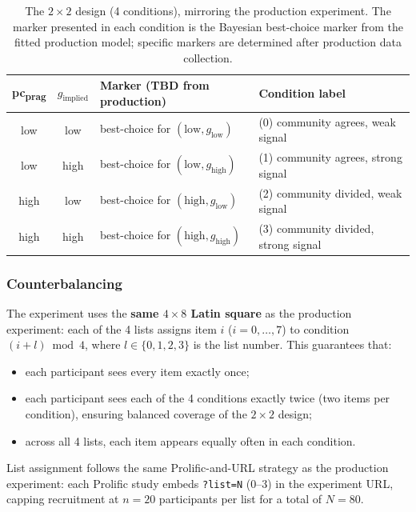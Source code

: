 \documentclass[12pt]{article}
\begin{document}
\begin{table}[ht]
\centering
\caption{%
  The $2\times2$ design (4 conditions), mirroring the production experiment.
  The marker presented in each condition is the Bayesian best-choice
  marker from the fitted production model; specific markers are
  determined after production data collection.}
\label{tab:design_comp}
\small
\begin{tabular}{ccll}
\toprule
\textbf{pc\textsubscript{prag}} &
\textbf{$g_{\mathrm{implied}}$} &
\textbf{Marker (TBD from production)} &
\textbf{Condition label} \\
\midrule
low  & low  & best-choice for $(\text{low}, g_{\text{low}})$  &
  (0) community agrees, weak signal \\
low  & high & best-choice for $(\text{low}, g_{\text{high}})$ &
  (1) community agrees, strong signal \\
high & low  & best-choice for $(\text{high}, g_{\text{low}})$ &
  (2) community divided, weak signal \\
high & high & best-choice for $(\text{high}, g_{\text{high}})$ &
  (3) community divided, strong signal \\
\bottomrule
\end{tabular}
\end{table}

\subsubsection{Counterbalancing}
\label{subsub:counterbalancing_comp}

The experiment uses the \textbf{same $4 \times 8$ Latin square} as the
production experiment: each of the 4 lists assigns item $i$
($i = 0,\ldots,7$) to condition $(i + l)\bmod 4$, where
$l \in \{0,1,2,3\}$ is the list number.
This guarantees that:
\begin{itemize}
  \item each participant sees every item exactly once;
  \item each participant sees each of the 4 conditions exactly twice
        (two items per condition), ensuring balanced coverage of the
        $2\times2$ design;
  \item across all 4 lists, each item appears equally often in each
        condition.
\end{itemize}

List assignment follows the same Prolific-and-URL strategy as the production
experiment: each Prolific study embeds \texttt{?list=N} (0--3) in the
experiment URL, capping recruitment at $n = 20$ participants per list
for a total of $N = 80$.
\end{document}
